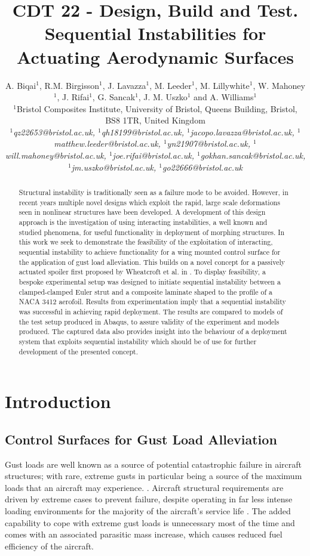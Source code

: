 \documentclass{IEEEtran}
\title{CDT 22 - Design, Build and Test.\\ Sequential Instabilities for Actuating Aerodynamic Surfaces}
\author{A. Biqai$^1$, R.M. Birgisson$^1$, J. Lavazza$^1$, M. Leeder$^1$, M. Lillywhite$^1$, W. Mahoney$^1$, J. Rifai$^1$, G. Sancak$^1$, J. M. Uszko$^1$ and A. Williams$^1$\\
	$^1$Bristol Composites Institute, University of Bristol, Queens Building, Bristol, BS8 1TR, United Kingdom\\
	\textit{$^1$qz22653@bristol.ac.uk, $^1$qh18199@bristol.ac.uk, $^1$jacopo.lavazza@bristol.ac.uk, $^1$matthew.leeder@bristol.ac.uk, $^1$yn21907@bristol.ac.uk, $^1$will.mahoney@bristol.ac.uk, $^1$joe.rifai@bristol.ac.uk, $^1$gokhan.sancak@bristol.ac.uk, $^1$jm.uszko@bristol.ac.uk, $^1$go22666@bristol.ac.uk}}
\begin{document}
	\maketitle
	
	\begin{abstract}
        Structural instability is traditionally seen as a failure mode to be avoided. However, in recent years multiple novel designs which exploit the rapid, large scale deformations seen in nonlinear structures have been developed. A development of this design approach is the investigation of using interacting instabilities, a well known and studied phenomena, for useful functionality in deployment of morphing structures. In this work we seek to demonstrate the feasibility of the exploitation of interacting, sequential instability to achieve functionality for a wing mounted control surface for the application of gust load alleviation. This builds on a novel concept for a passively actuated spoiler first proposed by Wheatcroft et al. in \cite{Wheatcroft_2023}. To display feasibility, a bespoke experimental setup was designed to initiate sequential instability between a clamped-clamped Euler strut and a composite laminate shaped to the profile of a NACA 3412 aerofoil. Results from experimentation imply that a sequential instability was successful in achieving rapid deployment. The results are compared to models of the test setup produced in Abaqus, to assure validity of the experiment and models produced. The captured data also provides insight into the behaviour of a deployment system that exploits sequential instability which should be of use for further development of the presented concept.
	\end{abstract}
	
	\section{Introduction}
		\subsection{Control Surfaces for Gust Load Alleviation}
		Gust loads are well known as a source of potential catastrophic failure in aircraft structures; with rare, extreme gusts in particular being a source of the maximum loads that an aircraft may experience. \cite{Wu2019,Guo_2015}. Aircraft structural requirements are driven by extreme cases to prevent failure, despite operating in far less intense loading environments for the majority of the aircraft's service life \cite{Li2021}. The added capability to cope with extreme gust loads is unnecessary most of the time and comes with an associated parasitic mass increase, which causes reduced fuel efficiency of the aircraft. 
		
\end{document}
